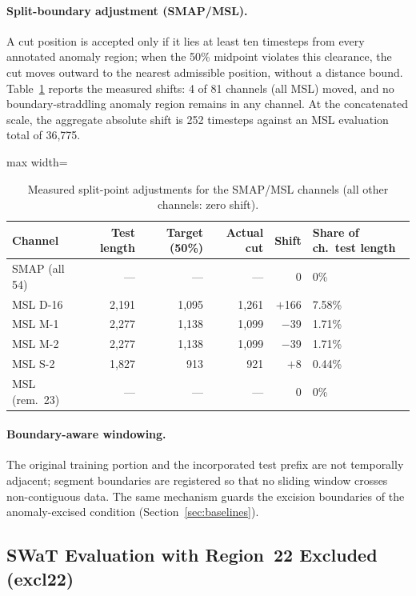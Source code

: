 \paragraph{Split-boundary adjustment (SMAP/MSL).}
A cut position is accepted only if it lies at least ten timesteps from every annotated anomaly
region; when the 50\% midpoint violates this clearance, the cut moves outward to the nearest
admissible position, without a distance bound.
Table~\ref{tab:split_shifts} reports the measured shifts: 4 of 81 channels (all MSL) moved, and
no boundary-straddling anomaly region remains in any channel.
At the concatenated scale, the aggregate absolute shift is 252 timesteps against an MSL
evaluation total of 36,775.

\begin{table}[tp]
\footnotesize
\centering
\caption{Measured split-point adjustments for the SMAP/MSL channels
  (all other channels: zero shift).}
\label{tab:split_shifts}
\begin{adjustbox}{max width=\linewidth}
\begin{tabular}{lrrrrl}
\toprule
Channel & Test length & Target (50\%) & Actual cut & Shift & Share of ch.\ test length \\
\midrule
SMAP (all 54) & --- & --- & --- & 0 & 0\% \\
MSL D-16 & 2{,}191 & 1{,}095 & 1{,}261 & $+$166 & 7.58\% \\
MSL M-1  & 2{,}277 & 1{,}138 & 1{,}099 & $-$39  & 1.71\% \\
MSL M-2  & 2{,}277 & 1{,}138 & 1{,}099 & $-$39  & 1.71\% \\
MSL S-2  & 1{,}827 & 913 & 921 & $+$8 & 0.44\% \\
MSL (rem.\ 23) & --- & --- & --- & 0 & 0\% \\
\bottomrule
\end{tabular}
\end{adjustbox}
\end{table}

\paragraph{Boundary-aware windowing.}
The original training portion and the incorporated test prefix are not temporally adjacent;
segment boundaries are registered so that no sliding window crosses non-contiguous data.
The same mechanism guards the excision boundaries of the anomaly-excised condition
(Section~\ref{sec:baselines}).

\subsection{SWaT Evaluation with Region~22 Excluded (excl22)}
\label{sec:appendix_swat}

